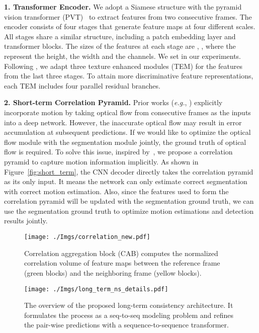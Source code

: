 \documentclass[10pt,twocolumn,letterpaper]{article}
\def\eg{\emph{e.g.}}
\begin{document}
\noindent\textbf{1. Transformer Encoder.}
We adopt a Siamese structure with the pyramid vision transformer (PVT)~\cite{wang2021pvtv2} to extract features from two consecutive frames. 
The encoder consists of four stages that generate feature maps at four different scales. All stages share a similar structure, including a patch embedding layer and transformer blocks. The sizes of the features at each stage are , , where the  represent the height, the width and the channels. We set  in our experiments. Following \cite{fan2021concealed}, we adapt three texture enhanced modules (TEM) for the features from the last three stages. To attain more discriminative feature representations, each TEM includes four parallel residual branches. 

\noindent\textbf{2. Short-term Correlation Pyramid.}
Prior works (\eg, \cite{tokmakov2017learning, yang2021selfsupervised}) explicitly incorporate motion by taking optical flow from consecutive frames as the inputs into a deep network. However, the inaccurate optical flow may result in error accumulation at subsequent predictions. If we would like to optimize the optical flow module with the segmentation module jointly, the ground truth of optical flow is required. To solve this issue, inspired by~\cite{li2021arvo}, we propose a correlation pyramid to capture motion information implicitly. As shown in Figure~\ref{fig:short_term}, the CNN decoder directly takes the correlation pyramid as its only input. It means the network can only estimate correct segmentation with correct motion estimation. Also, since the features used to form the correlation pyramid will be updated with the segmentation ground truth, we can use the segmentation ground truth to optimize motion estimations and detection results jointly.

\begin{figure}[b!]
\vspace{-10pt}
\begin{center}
\texttt{[image: ./Imgs/correlation\_new.pdf]}
\end{center}
\vspace{-20pt}
\caption{Correlation aggregation block (CAB) computes the normalized correlation volume of feature maps between the reference frame (green blocks) and the neighboring frame (yellow blocks).}
\label{fig:all_range}
\end{figure}


\begin{figure*}[t!]
\begin{center}
\texttt{[image: ./Imgs/long\_term\_ns\_details.pdf]}
\end{center}
\vspace{-20pt}
\caption{The overview of the proposed long-term consistency architecture. It formulates the process as a seq-to-seq modeling problem and refines the pair-wise predictions with a sequence-to-sequence transformer.}
\vspace{-2mm}
\label{fig:long_term}
\end{figure*}
\end{document}
